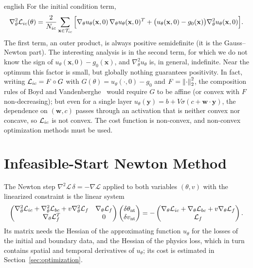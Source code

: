 \documentclass[0000.tex]{subfiles}
\begin{document}
\begin{hyphenrules}{english}
For the initial condition term,
\begin{equation}
  \nabla^2_\theta\mathcal{L}_{ic}(\theta)=\frac{2}{N_{ic}}\sum_{\mathbf{x}\in\mathcal{T}_{ic}}
  \Big[\nabla_\theta u_\theta(\mathbf{x},0)\,\nabla_\theta u_\theta(\mathbf{x},0)^{T}
  +\big(u_\theta(\mathbf{x},0)-g_0(\mathbf{x})\big)\nabla^2_\theta u_\theta(\mathbf{x},0)\Big].
  \label{eq:hessian-ic}
\end{equation}
The first term, an outer product, is always positive semidefinite (it is the Gauss--Newton part). The
interesting analysis is in the second term, for which we do not know the sign of
$u_\theta(\mathbf{x},0)-g_0(\mathbf{x})$, and $\nabla^2_\theta u_\theta$ is, in general, indefinite. Near the optimum this
factor is small, but globally nothing guarantees positivity. In fact, writing $\mathcal{L}_{ic}=F\circ G$ with
$G(\theta)=u_\theta(\cdot,0)-g_0$ and $F=\left\lVert \cdot \right\rVert_2^2$, the composition rules of
Boyd and Vandenberghe~\cite{boyd2004} would require $G$ to be affine (or convex with $F$ non-decreasing); but even for a
single layer $u_\theta(\mathbf{y})=b+V\sigma(c+\mathbf{w}\cdot\mathbf{y})$, the dependence on $(\mathbf{w},c)$ passes
through an activation that is neither convex nor concave, so $\mathcal{L}_{ic}$ is not convex. The cost function
is non-convex, and non-convex optimization methods must be used.

\section{Infeasible-Start Newton Method}\label{app-sec:newton}

The Newton step $\nabla^2\mathscr{L}\,\delta=-\nabla\mathscr{L}$ applied to both variables $(\theta,v)$
with the linearized constraint is the linear system \cite{boyd2004}
\begin{equation}
  \begin{pmatrix}
    \nabla^2_\theta\mathcal{L}_{ic}+\nabla^2_\theta\mathcal{L}_{bc}+v\nabla^2_\theta\mathcal{L}_f & \nabla_\theta\mathcal{L}_f\\
    \nabla_\theta\mathcal{L}_f^{T} & 0
  \end{pmatrix}
  \begin{pmatrix}\delta\theta_{\mathrm{nt}}\\ \delta v_{\mathrm{nt}}\end{pmatrix}
  =-\begin{pmatrix}\nabla_\theta\mathcal{L}_{ic}+\nabla_\theta\mathcal{L}_{bc}+v\nabla_\theta\mathcal{L}_f\\ \mathcal{L}_f\end{pmatrix}.
  \label{eq:newton-system}
\end{equation}
Its matrix needs the Hessian of the approximating function $u_\theta$ for the losses of the initial and
boundary data, and the Hessian of the physics loss, which in turn contains spatial and temporal
derivatives of $u_\theta$; its cost is estimated in Section~\ref{sec:optimization}.


\end{hyphenrules}
\end{document}

